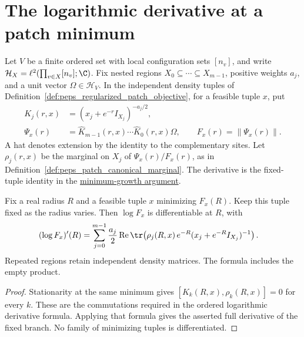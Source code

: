 \section{The logarithmic derivative at a patch minimum}
\label{sec:peps_actual_patch_minimum_derivative}

Let $V$ be a finite ordered set with local configuration sets $[n_v]$, and
write $\mathcal H_X=\ell^2(\prod_{v\in X}[n_v];\C)$.
Fix nested regions $X_0\subseteq\cdots\subseteq X_{m-1}$, positive weights
$a_j$, and a unit vector $\Omega\in\mathcal H_V$.
In the independent density tuples of
Definition~\ref{def:peps_regularized_patch_objective}, for a feasible tuple $x$,
put
\begin{align*}
    K_j(r,x)  & =(x_j+e^{-r}I_{X_j})^{-a_j/2},                       \\
    \Psi_x(r) & =\widehat K_{m-1}(r,x)\cdots\widehat K_0(r,x)\Omega,
    \qquad F_x(r)=\|\Psi_x(r)\|.
\end{align*}
A hat denotes extension by the identity to the complementary sites.
Let $\rho_j(r,x)$ be the marginal on $X_j$ of
$\Psi_x(r)/F_x(r)$, as in
Definition~\ref{def:peps_patch_canonical_marginal}.
The derivative is the fixed-tuple identity in the
\href{https://github.com/openai/math/blob/adc7f1241b42e322a6451854ab7e4b4c146bf78a/preprints/Polynomial-PEPS-approximation-of-gapped-square-grid-ground-states-September-24-2026/build/sections/03-patches.tex\#L453-L466}{minimum-growth argument}.

\begin{lemma}
    \label{thm:peps_actual_patch_minimum_log_derivative}
    \leanok
    Fix a real radius $R$ and a feasible tuple $x$ minimizing $F_x(R)$.
    Keep this tuple fixed as the radius varies. Then $\log F_x$ is
    differentiable at $R$, with
    \begin{align*}
        (\log F_x)'(R)
         & =\sum_{j=0}^{m-1}\frac{a_j}{2}
        \operatorname{Re}\tr\!\left(
        \rho_j(R,x)\,e^{-R}(x_j+e^{-R}I_{X_j})^{-1}\right).
    \end{align*}
    Repeated regions retain independent density matrices. The formula includes
    the empty product.
\end{lemma}
\begin{proof}\leanok
    Stationarity at the same minimum gives
    $[K_k(R,x),\rho_k(R,x)]=0$ for every $k$.
    These are the commutations required in the ordered logarithmic derivative
    formula. Applying that formula gives the asserted full derivative of the
    fixed branch. No family of minimizing tuples is differentiated.
\end{proof}
